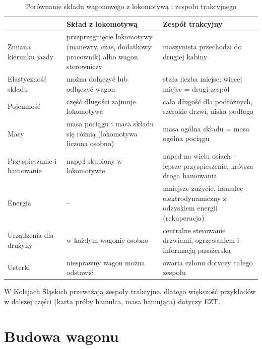 \begin{table}
	\caption{Porównanie składu wagonowego z lokomotywą i zespołu trakcyjnego}
	\label{tab:eztwagony}
	\small
	\begin{tabular}{|>{\raggedright\arraybackslash}m{}|>{\raggedright\arraybackslash}m{}|>{\raggedright\arraybackslash}m{}|}
		\hline
		& \textbf{Skład z lokomotywą} & \textbf{Zespół trakcyjny} \\ \hline
		Zmiana kierunku jazdy & przeprzęgnięcie lokomotywy (manewry, czas, dodatkowy pracownik) albo wagon sterowniczy & maszynista przechodzi do drugiej kabiny \\ \hline
		Elastyczność składu & można dołączyć lub odłączyć wagon & stała liczba miejsc; więcej miejsc = drugi zespół \\ \hline
		Pojemność & część długości zajmuje lokomotywa & cała długość dla podróżnych, szerokie drzwi, niska podłoga \\ \hline
		Masy & masa pociągu i masa składu się różnią (lokomotywa liczona osobno) & masa ogólna składu = masa ogólna pociągu \\ \hline
		Przyspieszanie i hamowanie & napęd skupiony w lokomotywie & napęd na wielu osiach – lepsze przyspieszenie, krótsza droga hamowania \\ \hline
		Energia & – & mniejsze zużycie, hamulec elektrodynamiczny z odzyskiem energii (rekuperacja) \\ \hline
		Urządzenia dla drużyny & w każdym wagonie osobno & centralne sterowanie drzwiami, ogrzewaniem i informacją pasażerską \\ \hline
		Usterki & niesprawny wagon można odstawić & awaria członu dotyczy całego zespołu \\ \hline
	\end{tabular}
\end{table}

W Kolejach Śląskich przeważają zespoły trakcyjne, dlatego większość przykładów w dalszej części (karta próby hamulca, masa hamująca) dotyczy EZT.

\section{Budowa wagonu}

